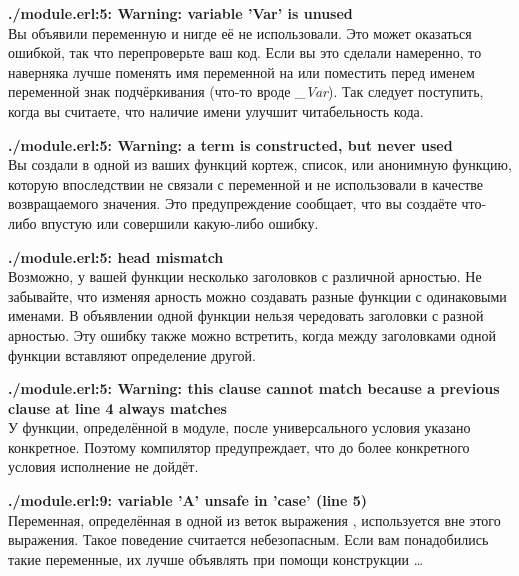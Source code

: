 \blankline
\begin{minipage}{\textwidth}
    \textbf{./module.erl:5: Warning: variable 'Var' is unused}\\
    Вы объявили переменную и нигде её не использовали.
    Это может оказаться ошибкой, так что перепроверьте ваш код.
    Если вы это сделали намеренно, то наверняка лучше поменять имя переменной на \ops{\strut{\_}} или поместить перед именем переменной знак подчёркивания (что\--то вроде \emph{\_Var}).
    Так следует поступить, когда вы считаете, что наличие имени улучшит читабельность кода.
\end{minipage}

\blankline
\begin{minipage}{\textwidth}
    \textbf{./module.erl:5: Warning: a term is constructed, but never used}\\
    Вы создали в одной из ваших функций кортеж, список, или анонимную функцию, которую впоследствии не связали с переменной и не использовали в качестве возвращаемого значения.
    Это предупреждение сообщает, что вы создаёте что\--либо впустую или совершили какую\--либо ошибку.
\end{minipage}

\blankline
\begin{minipage}{\textwidth}
    \textbf{./module.erl:5: head mismatch}\\
    Возможно, у вашей функции несколько заголовков с различной арностью.
    Не забывайте, что изменяя арность можно создавать разные функции с одинаковыми именами.
    В объявлении одной функции нельзя чередовать заголовки с разной арностью.
    Эту ошибку также можно встретить, когда между заголовками одной функции вставляют определение другой.
\end{minipage}

\blankline
\begin{minipage}{\textwidth}
    \textbf{./module.erl:5: Warning: this clause cannot match because a previous clause at line 4 always matches}\\
    У функции, определённой в модуле, после универсального условия указано конкретное.
    Поэтому компилятор предупреждает, что до более конкретного условия исполнение не дойдёт.
\end{minipage}

\blankline
\begin{minipage}{\textwidth}
    \textbf{./module.erl:9: variable 'A' unsafe in 'case' (line 5)}\\
    Переменная, определённая в одной из веток выражения , используется вне этого выражения.
    Такое поведение считается небезопасным.
    Если вам понадобились такие переменные, их лучше объявлять при помощи конструкции \ldots
\end{minipage}

